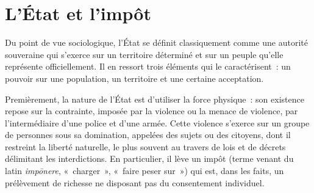 %

\section*{L'État et l'impôt}

Du point de vue sociologique, l'État se définit classiquement comme une autorité souveraine qui s'exerce sur un territoire déterminé et sur un peuple qu'elle représente officiellement. Il en ressort trois éléments qui le caractérisent~: un pouvoir sur une population, un territoire et une certaine acceptation.

Premièrement, la nature de l'État est d'utiliser la force physique~: son existence repose sur la contrainte, imposée par la violence ou la menace de violence, par l'intermédiaire d'une police et d'une armée. Cette violence s'exerce sur un groupe de personnes sous sa domination, appelées des sujets ou des citoyens, dont il restreint la liberté naturelle, le plus souvent au travers de lois et de décrets délimitant les interdictions. En particulier, il lève un impôt (terme venant du latin \emph{impōnere}, «~charger~», «~faire peser sur~») qui est, dans les faits, un prélèvement de richesse ne disposant pas du consentement individuel. %

